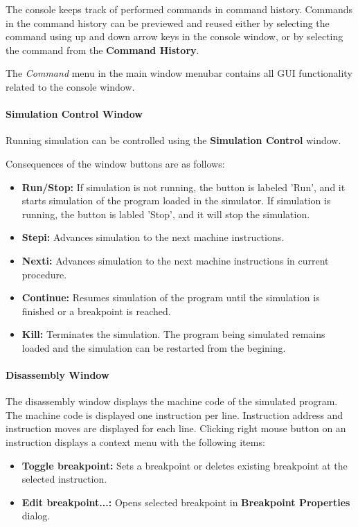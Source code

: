 \documentclass[twoside]{tceusermanual}
\begin{document}
The console keeps track of performed commands in command history. Commands in
the command history can be previewed and reused either by selecting the
command using up and down arrow keys in the console window, or by selecting
the command from the \textbf{Command History}.

The \emph{Command} menu in the main window menubar contains all GUI
functionality related to the console window.


\paragraph{Simulation Control Window}

Running simulation can be controlled using the \textbf{Simulation Control}
window.

Consequences of the window buttons are as follows:
\begin{itemize}
\item \textbf{Run/Stop:} If simulation is not running, the button is
labeled 'Run', and it starts simulation of the program loaded in the
simulator. If simulation is running, the button is labled 'Stop', and
it will stop the simulation.

\item \textbf{Stepi:} Advances simulation to the next machine instructions.

\item \textbf{Nexti:} Advances simulation to the next machine instructions
in current procedure.

\item \textbf{Continue:} Resumes simulation of the program until the
simulation is finished or a breakpoint is reached.
\item \textbf{Kill:} Terminates the simulation. The program being simulated
remains loaded and the simulation can be restarted from the begining.
\end{itemize}


\paragraph{Disassembly Window}
\label{sec:mcode_win}


The disassembly window displays the
machine code of the simulated program. The machine code is displayed
one instruction per line. Instruction address and instruction
moves are displayed for each line.
Clicking right mouse button on an instruction displays a context menu with the
following items:
\begin{itemize}
\item \textbf{Toggle breakpoint:} Sets a breakpoint or deletes existing 
breakpoint at the selected instruction.
\item \textbf{Edit breakpoint...:} Opens selected breakpoint in
\textbf{Breakpoint Properties} dialog.

\end{itemize}
\end{document}
